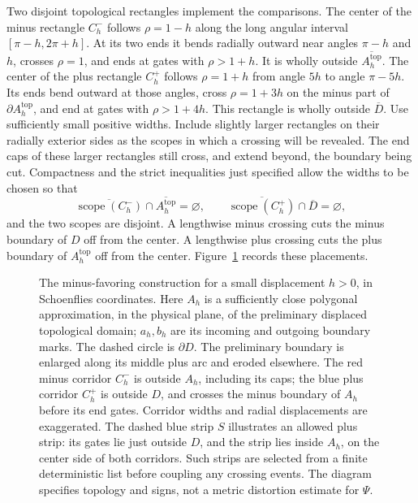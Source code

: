 Two disjoint topological rectangles implement the comparisons.  The
center of the minus rectangle $C_h^-$ follows $\rho=1-h$ along the long
angular interval $[\pi-h,2\pi+h]$.  At its two ends it bends radially
outward near angles $\pi-h$ and $h$, crosses $\rho=1$, and ends at gates
with $\rho>1+h$.  It is wholly outside $\overline{A_h^{\mathrm{top}}}$.
The center of the plus rectangle $C_h^+$ follows $\rho=1+h$ from angle
$5h$ to angle $\pi-5h$.  Its ends bend outward at those angles, cross
$\rho=1+3h$ on the minus part of $\partial A_h^{\mathrm{top}}$, and end
at gates with $\rho>1+4h$.  This rectangle is wholly outside $\overline D$.
Use sufficiently small positive widths.  Include slightly larger
rectangles on their radially exterior sides as the scopes in which a
crossing will be revealed.  The end caps of these larger rectangles still
cross, and extend beyond, the boundary being cut.  Compactness and the
strict inequalities just specified allow the widths to be chosen so that
\begin{equation}
 \overline{\operatorname{scope}(C_h^-)}\cap\overline{A_h^{\mathrm{top}}}
 =\varnothing,\qquad
 \overline{\operatorname{scope}(C_h^+)}\cap\overline D=\varnothing,
 \label{eq:curves-scope-clearances}
\end{equation}
and the two scopes are disjoint.  A lengthwise minus crossing cuts the
minus boundary of $D$ off from the center.  A lengthwise plus crossing
cuts the plus boundary of $A_h^{\mathrm{top}}$ off from the center.
Figure~\ref{fig:boundary-squeeze} records these placements.

\begin{figure}[tb]
 \centering
 
 \caption{The minus-favoring construction for a small displacement $h>0$,
 in Schoenflies coordinates. Here $A_h$ is a sufficiently close polygonal
 approximation, in the physical plane, of the preliminary displaced
 topological domain; $a_h,b_h$ are its incoming and outgoing boundary marks.
 The dashed circle is $\partial D$. The preliminary boundary is enlarged
 along its middle plus arc and eroded elsewhere. The red minus corridor
 $C_h^-$ is outside $A_h$, including its caps; the blue plus corridor
 $C_h^+$ is outside $D$, and crosses the minus boundary of $A_h$ before
 its end gates. Corridor widths and radial displacements are exaggerated.
 The dashed blue strip $S$ illustrates an allowed plus strip: its gates
 lie just outside $D$, and the strip lies inside $A_h$, on the center
 side of both corridors.  Such strips are selected from a finite
 deterministic list before coupling any crossing events.  The diagram
 specifies topology and signs, not a metric distortion estimate for
 $\Psi$.}
 \label{fig:boundary-squeeze}
\end{figure}

